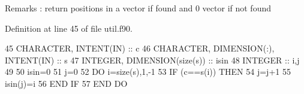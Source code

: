 \begin{DoxyRemark}{Remarks}
\+: return positions in a vector if found and 0 vector if not found 
\end{DoxyRemark}


Definition at line 45 of file util.\+f90.


\begin{DoxyCode}
45     \textcolor{keywordtype}{CHARACTER}, \textcolor{keywordtype}{INTENT(IN)} :: c
46     \textcolor{keywordtype}{CHARACTER}, \textcolor{keywordtype}{DIMENSION(:)}, \textcolor{keywordtype}{INTENT(IN)} :: s
47     \textcolor{keywordtype}{INTEGER}, \textcolor{keywordtype}{DIMENSION(size(s))} :: isin
48     \textcolor{keywordtype}{INTEGER} :: i,j
49 
50     isin=0
51     j=0
52     \textcolor{keywordflow}{DO} i=\textcolor{keyword}{size}(s),1,-1
53        \textcolor{keywordflow}{IF} (c==s(i)) \textcolor{keywordflow}{THEN}
54           j=j+1
55           isin(j)=i
56 \textcolor{keywordflow}{       END IF}
57 \textcolor{keywordflow}{    END DO}
\end{DoxyCode}
